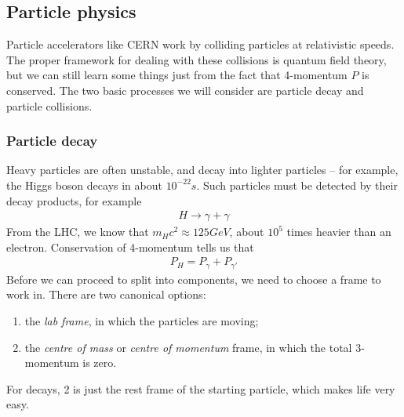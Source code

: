 \documentclass{../template/note}
\begin{document}
    \subsection{Particle physics}

    Particle accelerators like CERN work by colliding particles at relativistic speeds. The proper framework for dealing with these collisions is quantum field theory, but we can still learn some things just from the fact that 4-momentum \(P\) is conserved. The two basic processes we will consider are particle decay and particle collisions.

    \subsubsection{Particle decay}

    Heavy particles are often unstable, and decay into lighter particles -- for example, the Higgs boson decays in about \(10^{-22} \si{s}\). Such particles must be detected by their decay products, for example
    \begin{align*}
        H \longrightarrow \gamma + \gamma
    \end{align*}
    From the LHC, we know that \(m_H c^2 \approx 125 \si{GeV}\), about \(10^5\) times heavier than an electron. Conservation of 4-momentum tells us that
    \begin{align*}
        P_H = P_\gamma + P_{\gamma'}
    \end{align*}
    Before we can proceed to split into components, we need to choose a frame to work in. There are two canonical options:
    \begin{enumerate}
        \item the \emph{lab frame}, in which the particles are moving;
        \item the \emph{centre of mass} or \emph{centre of momentum} frame, in which the total 3-momentum is zero.
    \end{enumerate}
    For decays, 2 is just the rest frame of the starting particle, which makes life very easy.   
    
    
\end{document}

